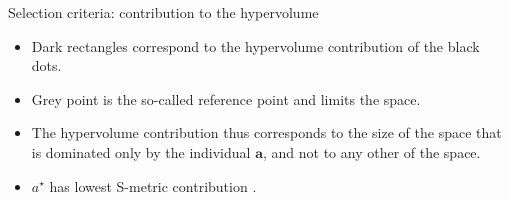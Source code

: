 \begin{frame}[allowframebreaks]{Selection criteria: contribution to the hypervolume}
\footnotesize
\vspace*{-0.5cm}
\begin{itemize}
\item Dark rectangles correspond to the hypervolume contribution of the black dots.
\item Grey point is the so-called reference point and limits the space.
\item The hypervolume contribution thus corresponds to the size of the space that is dominated only by the individual $\bm{a}$, and not to any other of the space.
\item $a^\star$ has lowest S-metric contribution .
\end{itemize}
\end{frame}





